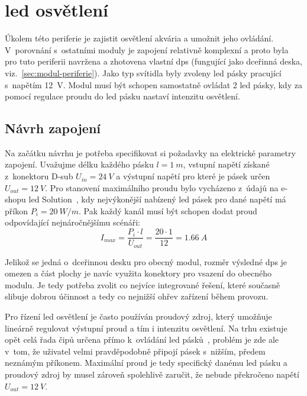 \section{\acs{led} osvětlení}
\label{sec:perif-led-osvetleni}

    Úkolem této periferie je zajistit osvětlení akvária a umožnit jeho ovládání. V~porovnání s~ostatními moduly je zapojení relativně komplexní a proto byla pro tuto periferii navržena a zhotovena vlastní \acs{dps} (fungující jako dceřinná deska, viz.~\ref{sec:modul-periferie}). Jako typ svítidla byly zvoleny \acs{led} pásky pracující s~napětím \qty{12}{V}. Modul musí být schopen samostatně ovládat 2 \acs{led} pásky, kdy za pomocí regulace proudu do \acs{led} pásku nastaví intenzitu osvětlení. 

\subsection{Návrh zapojení}
    Na začátku návrhu je potřeba specifikovat si požadavky na elektrické parametry zapojení. Uvažujme délku každého pásku \(l=\qty{1}{m}\), vstupní napětí získané z~konektoru D-sub \(U_{in} =\qty{24}{V}\) a výstupní napětí pro které je pásek určen \(U_{out} =\qty{12}{V}\). Pro stanovení maximálního proudu bylo vycházeno z~údajů na e-shopu \acs{led} Solution~\cite{eshop-ledsolution-svetlo}, kdy nejvýkonější nabízený \acs{led} pásek pro dané napětí má příkon \(P_{i}= \qty{20}{W/m}\). Pak každý kanál musí být schopen dodat proud odpovídající nejnáročnějšímu scénáři:
    \begin{equation}  
        I_{max} = \frac{P_{i}\cdot l }{U_{out}} = \frac{20\cdot 1 }{12} = \qty{1.66}{A}
    \end{equation}

    Jelikož se jedná o~dceřinnou desku pro obecný modul, rozměr výsledné \acs{dps} je omezen a část plochy je navíc využita konektory pro vsazení do obecného modulu. Je tedy potřeba zvolit co nejvíce integrované řešení, které současně slibuje dobrou účinnost a tedy co nejnižší ohřev zařízení během provozu.

    Pro řízení \acs{led} osvětlení je často používán proudový zdroj, který umožňuje lineárně regulovat výstupní proud a tím i intenzitu osvětlení. Na trhu existuje opět celá řada čipů určena přímo k~ovládání \acs{led} pásků~\cite{TI_LED_Drivers}, problém je zde ale v~tom, že uživatel velmi pravděpodobně připojí pásek s~nižším, předem neznámým příkonem. Maximální proud je tedy specifický danému \acs{led} pásku a proudový zdroj by musel zároveň spolehlivě zaručit, že nebude překročeno napětí \(U_{out} =\qty{12}{V} \).

